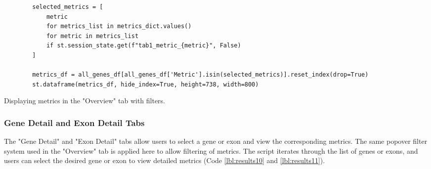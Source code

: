 \begin{longlisting}
\begin{verbatim}
        selected_metrics = [
            metric
            for metrics_list in metrics_dict.values()
            for metric in metrics_list
            if st.session_state.get(f"tab1_metric_{metric}", False)
        ]

        metrics_df = all_genes_df[all_genes_df['Metric'].isin(selected_metrics)].reset_index(drop=True)
        st.dataframe(metrics_df, hide_index=True, height=738, width=800)
\end{verbatim}
\caption{Displaying metrics in the "Overview" tab with filters.}
\label{lbl:results9}
\end{longlisting}

\subsubsection{\textbf{Gene Detail and Exon Detail Tabs}}

The "Gene Detail" and "Exon Detail" tabs allow users to select a gene or exon and view the corresponding metrics. The same popover filter system used in the "Overview" tab is applied here to allow filtering of metrics. The script iterates through the list of genes or exons, and users can select the desired gene or exon to view detailed metrics (Code \ref{lbl:results10} and \ref{lbl:results11}).

